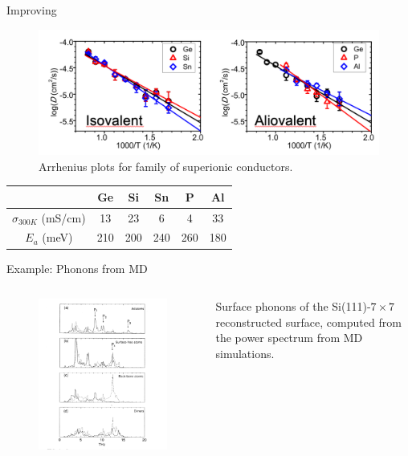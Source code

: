 \documentclass[aspectratio=169]{beamer}
\begin{document}
    \begin{frame}{Improving }
        \begin{figure}
            \centering    \includegraphics[width=0.65\linewidth]{lectures/figures/13-LMPS.png}
            \caption{Arrhenius plots for  family of superionic conductors.\cite{ongPhaseStabilityElectrochemical2013}}
        \end{figure}

        \begin{table}[]
            \centering
            \begin{tabular}{c|c|c|c|c|c}
                & Ge  & Si  & Sn  & P   & Al  \\
                \hline
                $\sigma_{300K}$ (mS/cm) & 13  & 23  & 6   & 4   & 33  \\
                $E_a$ (meV)             & 210 & 200 & 240 & 260 & 180
            \end{tabular}
        \end{table}

    \end{frame}

    \begin{frame}{Example: Phonons from MD}
        \begin{columns}
            \begin{figure}
                \centering
                \includegraphics[width=0.7\linewidth]{lectures/figures/13-Phonons_MD.png}
            \end{figure}
            Surface phonons of the Si(111)-$7\times 7$ reconstructed surface, computed from the power spectrum from MD simulations.\cite{kimSurfacePhononsSi1995}
        \end{columns}
    \end{frame}
\end{document}
